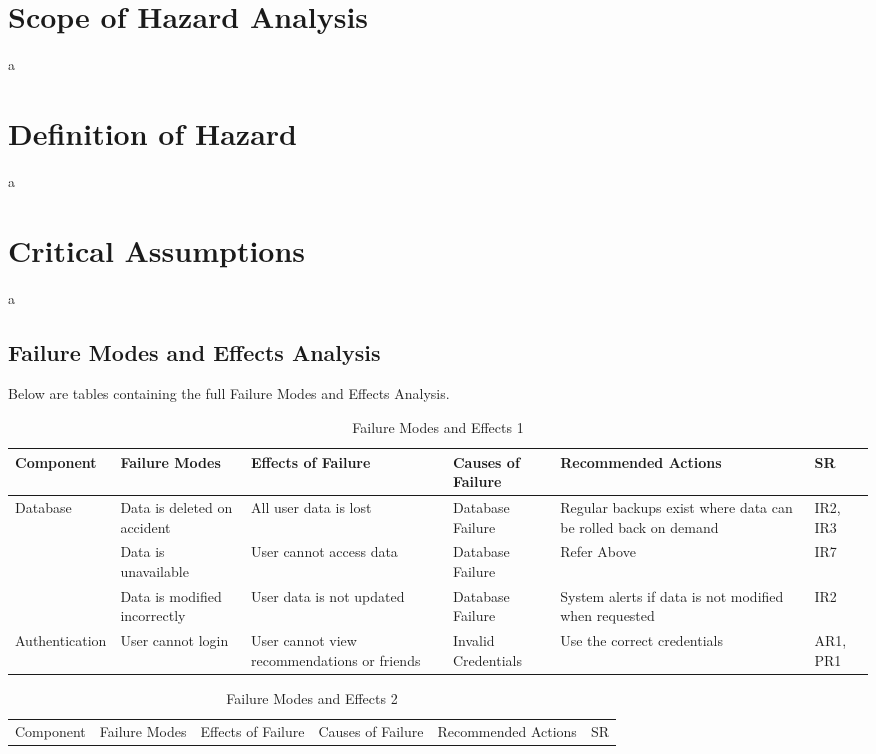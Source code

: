 \documentclass[12pt]{article}
\begin{document}
\section{Scope of Hazard Analysis}
a

\section{Definition of Hazard}
a

\section{Critical Assumptions}
a

\begin{landscape}
\newpage
\section{Failure Modes and Effects Analysis}
Below are tables containing the full Failure Modes and Effects Analysis.
\begin{table}[hp]
	\caption{Failure Modes and Effects 1} \label{TblFMEA1}
	\begin{tabularx}{\linewidth}{| l | X X l X l |}
		\hline
		Component & Failure Modes & Effects of Failure & Causes of Failure & Recommended Actions & SR \\
		\hline
		Database & Data is deleted on accident & All user data is lost & Database Failure & Regular backups exist where data can be rolled back on demand & IR2, IR3 \\
		\hdashline
		~ & Data is unavailable & User cannot access data & Database Failure & Refer Above & IR7 \\
		\hdashline
		~ & Data is modified incorrectly & User data is not updated & Database Failure & System alerts if data is not modified when requested & IR2 \\
		\hline
		Authentication & User cannot login & User cannot view recommendations or friends & Invalid Credentials & Use the correct credentials & AR1, PR1 \\
		\hline
		\end{tabularx}
\end{table}
\newpage
\begin{table}[hp]
	\caption{Failure Modes and Effects 2} \label{TblFMEA2}
	\begin{tabularx}{\linewidth}{| l | X X l X l |}
		\hline
		Component & Failure Modes & Effects of Failure & Causes of Failure & Recommended Actions & SR \\

\end{tabularx}
\end{table}
\end{landscape}
\end{document}
